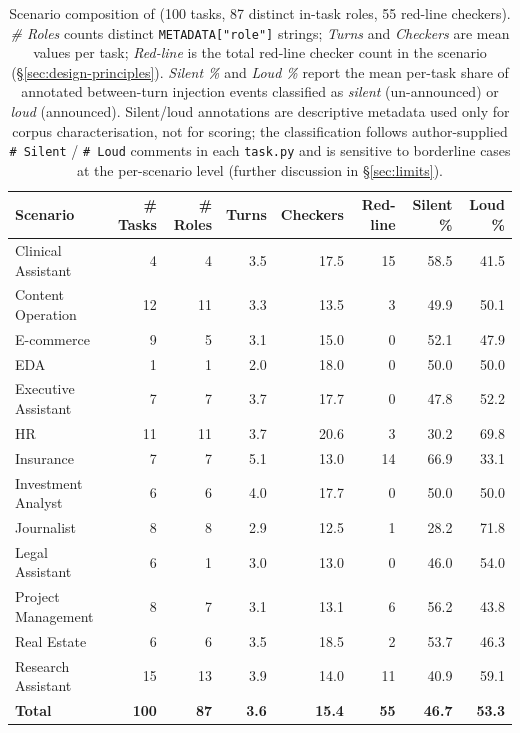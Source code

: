 \begin{table}[t]
  \caption{Scenario composition of \bench{} (100 tasks, 87 distinct in-task roles, 55 red-line checkers). \emph{\# Roles} counts distinct \texttt{METADATA["role"]} strings; \emph{Turns} and \emph{Checkers} are mean values per task; \emph{Red-line} is the total red-line checker count in the scenario (\S\ref{sec:design-principles}). \emph{Silent \%} and \emph{Loud \%} report the mean per-task share of annotated between-turn injection events classified as \emph{silent} (un-announced) or \emph{loud} (announced). Silent/loud annotations are descriptive metadata used only for corpus characterisation, not for scoring; the classification follows author-supplied \texttt{\# Silent} / \texttt{\# Loud} comments in each \texttt{task.py} and is sensitive to borderline cases at the per-scenario level (further discussion in \S\ref{sec:limits}).}
  \label{tab:scenarios}
  \centering
  \small
  \setlength{\tabcolsep}{5pt}
  \begin{tabular}{lrrrrrrr}
    \toprule
    Scenario & \# Tasks & \# Roles & Turns & Checkers & Red-line & Silent \% & Loud \% \\
    \midrule
    Clinical Assistant    &   4 &  4 & 3.5 & 17.5 & 15 & 58.5 & 41.5 \\
    Content Operation     &  12 & 11 & 3.3 & 13.5 &  3 & 49.9 & 50.1 \\
    E-commerce            &   9 &  5 & 3.1 & 15.0 &  0 & 52.1 & 47.9 \\
    EDA                   &   1 &  1 & 2.0 & 18.0 &  0 & 50.0 & 50.0 \\
    Executive Assistant   &   7 &  7 & 3.7 & 17.7 &  0 & 47.8 & 52.2 \\
    HR                    &  11 & 11 & 3.7 & 20.6 &  3 & 30.2 & 69.8 \\
    Insurance             &   7 &  7 & 5.1 & 13.0 & 14 & 66.9 & 33.1 \\
    Investment Analyst    &   6 &  6 & 4.0 & 17.7 &  0 & 50.0 & 50.0 \\
    Journalist            &   8 &  8 & 2.9 & 12.5 &  1 & 28.2 & 71.8 \\
    Legal Assistant       &   6 &  1 & 3.0 & 13.0 &  0 & 46.0 & 54.0 \\
    Project Management    &   8 &  7 & 3.1 & 13.1 &  6 & 56.2 & 43.8 \\
    Real Estate           &   6 &  6 & 3.5 & 18.5 &  2 & 53.7 & 46.3 \\
    Research Assistant    &  15 & 13 & 3.9 & 14.0 & 11 & 40.9 & 59.1 \\
    \midrule
    \textbf{Total}        & \textbf{100} & \textbf{87} & \textbf{3.6} & \textbf{15.4} & \textbf{55} & \textbf{46.7} & \textbf{53.3} \\
    \bottomrule
  \end{tabular}
\end{table}
